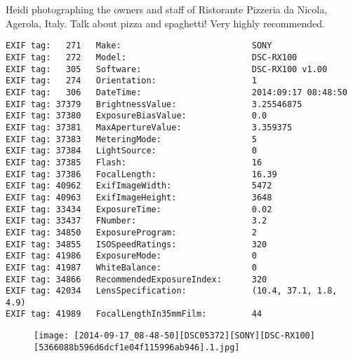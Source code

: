 \section{\protect{}}
\noindent Heidi photographing the owners and staff of Ristorante Pizzeria da Nicola, Agerola, Italy. Talk about pizza and spaghetti! Very highly recommended.
\noindent
\begin{lstlisting}
EXIF tag:   271   Make:                          SONY
EXIF tag:   272   Model:                         DSC-RX100
EXIF tag:   305   Software:                      DSC-RX100 v1.00
EXIF tag:   274   Orientation:                   1
EXIF tag:   306   DateTime:                      2014:09:17 08:48:50
EXIF tag: 37379   BrightnessValue:               3.25546875
EXIF tag: 37380   ExposureBiasValue:             0.0
EXIF tag: 37381   MaxApertureValue:              3.359375
EXIF tag: 37383   MeteringMode:                  5
EXIF tag: 37384   LightSource:                   0
EXIF tag: 37385   Flash:                         16
EXIF tag: 37386   FocalLength:                   16.39
EXIF tag: 40962   ExifImageWidth:                5472
EXIF tag: 40963   ExifImageHeight:               3648
EXIF tag: 33434   ExposureTime:                  0.02
EXIF tag: 33437   FNumber:                       3.2
EXIF tag: 34850   ExposureProgram:               2
EXIF tag: 34855   ISOSpeedRatings:               320
EXIF tag: 41986   ExposureMode:                  0
EXIF tag: 41987   WhiteBalance:                  0
EXIF tag: 34866   RecommendedExposureIndex:      320
EXIF tag: 42034   LensSpecification:             (10.4, 37.1, 1.8, 4.9)
EXIF tag: 41989   FocalLengthIn35mmFilm:         44

\end{lstlisting}
\clearpage
\begin{figure}
\raggedleft
\texttt{[image: [2014-09-17\_08-48-50][DSC05372][SONY][DSC-RX100][5366088b596d6dcf1e04f115996ab946].1.jpg]}
\end{figure}


\clearpage
